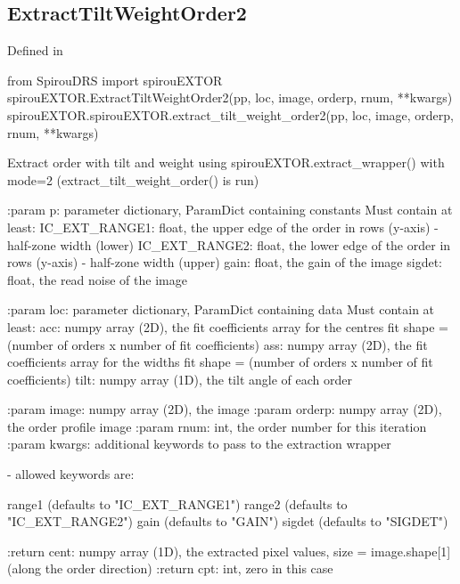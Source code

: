
\noindent\begin{minipage}{\textwidth}
\subsection{ExtractTiltWeightOrder2}

Defined in \spirouEXTOR{}

\begin{pythonbox}
from SpirouDRS import spirouEXTOR
spirouEXTOR.ExtractTiltWeightOrder2(pp, loc, image, orderp, rnum, **kwargs)
spirouEXTOR.spirouEXTOR.extract_tilt_weight_order2(pp, loc, image, orderp, rnum, **kwargs)
\end{pythonbox}

\begin{pythondocstring}
Extract order with tilt and weight using
spirouEXTOR.extract_wrapper() with mode=2
(extract_tilt_weight_order() is run)

:param p: parameter dictionary, ParamDict containing constants
    Must contain at least:
            IC_EXT_RANGE1: float, the upper edge of the order in rows
                           (y-axis) - half-zone width (lower)
            IC_EXT_RANGE2: float, the lower edge of the order in rows
                           (y-axis) - half-zone width (upper)
            gain: float, the gain of the image
            sigdet: float, the read noise of the image

:param loc: parameter dictionary, ParamDict containing data
        Must contain at least:
            acc: numpy array (2D), the fit coefficients array for
                  the centres fit
                  shape = (number of orders x number of fit coefficients)
            ass: numpy array (2D), the fit coefficients array for
                  the widths fit
                  shape = (number of orders x number of fit coefficients)
            tilt: numpy array (1D), the tilt angle of each order

:param image: numpy array (2D), the image
:param orderp: numpy array (2D), the order profile image
:param rnum: int, the order number for this iteration
:param kwargs: additional keywords to pass to the extraction wrapper

        - allowed keywords are:

        range1  (defaults to "IC_EXT_RANGE1")
        range2  (defaults to "IC_EXT_RANGE2")
        gain    (defaults to "GAIN")
        sigdet  (defaults to "SIGDET")

:return cent: numpy array (1D), the extracted pixel values,
             size = image.shape[1] (along the order direction)
:return cpt: int, zero in this case
\end{pythondocstring}
\end{minipage}

